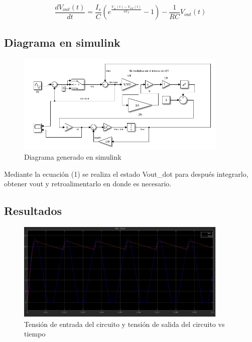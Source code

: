 \begin{equation}
    \frac{dV_{out}(t)}{dt} = \frac{I_s}{C} \left( e^{\frac{V_{in}(t) - V_{out}(t)}{nV_T}} - 1 \right) - \frac{1}{RC}V_{out}(t)
\end{equation}

\subsection{Diagrama en simulink}

\begin{figure}[H]\label{fig:Diagrama}
    \centering
    \includegraphics[width=0.9\textwidth]{imagenes/Diagrama.png}
    \caption{Diagrama generado en simulink}
\end{figure}

Mediante la ecuación (1) se realiza el estado Vout\_dot para después integrarlo, obtener vout 
y retroalimentarlo en donde es necesario.

\subsection{Resultados}
\begin{figure}[H]\label{fig:voutVin}
    \centering
    \includegraphics[width=0.9\textwidth]{imagenes/VoutVin.jpg}
    \caption{Tensión de entrada del circuito y tensión de salida
    del circuito vs tiempo}
\end{figure}

